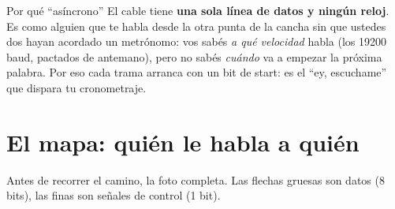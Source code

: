 \documentclass[11pt,a4paper]{article}
\begin{document}
\begin{intuicion}{Por qu\'e ``as\'incrono''}
El cable tiene \textbf{una sola l\'inea de datos y ning\'un reloj}. Es como
alguien que te habla desde la otra punta de la cancha sin que ustedes dos
hayan acordado un metr\'onomo: vos sab\'es \emph{a qu\'e velocidad} habla
(los 19200 baud, pactados de antemano), pero no sab\'es \emph{cu\'ando} va a
empezar la pr\'oxima palabra. Por eso cada trama arranca con un bit de start:
es el ``ey, escuchame'' que dispara tu cronometraje.
\end{intuicion}

\section{El mapa: qui\'en le habla a qui\'en}

Antes de recorrer el camino, la foto completa. Las flechas gruesas son datos
(8 bits), las finas son se\~nales de control (1 bit).
\end{document}
